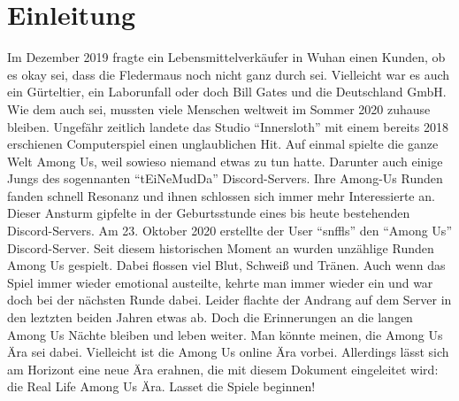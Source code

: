 \section{Einleitung}
Im Dezember 2019 fragte ein Lebensmittelverkäufer in Wuhan einen Kunden,
ob es okay sei, dass die Fledermaus noch nicht ganz durch sei. Vielleicht war
es auch ein Gürteltier, ein Laborunfall oder doch Bill Gates und die Deutschland
GmbH. Wie dem auch sei, mussten viele Menschen weltweit im Sommer 2020 zuhause
bleiben. Ungefähr zeitlich landete das Studio ``Innersloth'' mit einem
bereits 2018 erschienen Computerspiel einen unglaublichen Hit. Auf einmal
spielte die ganze Welt Among Us, weil sowieso niemand etwas zu tun hatte.
\newline
Darunter auch einige Jungs des sogennanten ``tEiNeMudDa'' Discord-Servers.
Ihre Among-Us Runden fanden schnell Resonanz und ihnen schlossen sich immer mehr
Interessierte an. Dieser Ansturm gipfelte in der Geburtsstunde eines bis heute
bestehenden Discord-Servers. Am 23. Oktober 2020 erstellte der User
``snffls'' den ``Among Us'' Discord-Server. Seit diesem historischen
Moment an wurden unzählige Runden Among Us gespielt. Dabei flossen viel Blut,
Schweiß und Tränen. Auch wenn das Spiel immer wieder emotional austeilte, kehrte
man immer wieder ein und war doch bei der nächsten Runde dabei.
\newline
Leider flachte der Andrang auf dem Server in den leztzten beiden Jahren etwas
ab. Doch die Erinnerungen an die langen Among Us Nächte bleiben und leben
weiter. Man könnte meinen, die Among Us Ära sei dabei. Vielleicht ist die Among
Us online Ära vorbei. Allerdings lässt sich am Horizont eine neue Ära erahnen,
die mit diesem Dokument eingeleitet wird: die Real Life Among Us Ära. Lasset die
Spiele beginnen!
